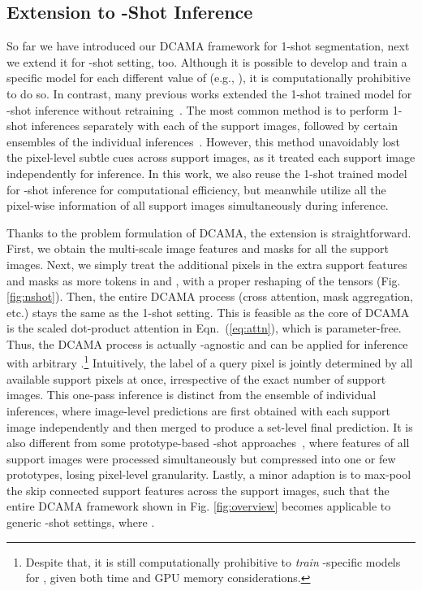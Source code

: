 \documentclass[runningheads,table,xcdraw]{llncs}
\begin{document}
\subsection{Extension to -Shot Inference}
So far we have introduced our DCAMA framework for 1-shot segmentation, next we extend it for -shot setting, too.
Although it is possible to develop and train a specific model for each different value of  (e.g., \cite{zhang2019canet}), it is computationally prohibitive to do so.
In contrast, many previous works extended the 1-shot trained model for -shot inference without retraining~\cite{min2021hypercorrelation,tian2020prior,zhang2021self}.
The most common method is to perform  1-shot inferences separately with each of the support images, followed by certain ensembles of the individual inferences~\cite{min2021hypercorrelation,zhang2021self}.
However, this method unavoidably lost the pixel-level subtle cues across support images, as it treated each support image independently for inference.
In this work, we also reuse the 1-shot trained model for -shot inference for computational efficiency, but meanwhile utilize all the pixel-wise information of all support images simultaneously during inference.

Thanks to the problem formulation of DCAMA, the extension is straightforward.
First, we obtain the multi-scale image features and masks for all the support images.
Next, we simply treat the additional pixels in the extra support features and masks as more tokens in  and , with a proper reshaping of the tensors (Fig. \ref{fig:nshot}).
Then, the entire DCAMA process (cross attention, mask aggregation, etc.) stays the same as the 1-shot setting.
This is feasible as the core of DCAMA is the scaled dot-product attention in Eqn.~(\ref{eq:attn}), which is parameter-free.
Thus, the DCAMA process is actually -agnostic and can be applied for inference with arbitrary .\footnote{Despite that, it is still computationally prohibitive to \textit{train} -specific models for , given both time and GPU memory considerations.}
Intuitively, the label of a query pixel is jointly determined by all available support pixels at once, irrespective of the exact number of support images.
This one-pass inference is distinct from the ensemble of individual inferences, where image-level predictions are first obtained with each support image independently and then merged to produce a set-level final prediction.
It is also different from some prototype-based -shot approaches~\cite{dong2018few,yang2020prototype}, where features of all support images were processed simultaneously but compressed into one or few prototypes, losing pixel-level granularity.
Lastly, a minor adaption is to max-pool the skip connected support features across the support images, such that the entire DCAMA framework shown in Fig. \ref{fig:overview} becomes applicable to generic -shot settings, where .
\end{document}
